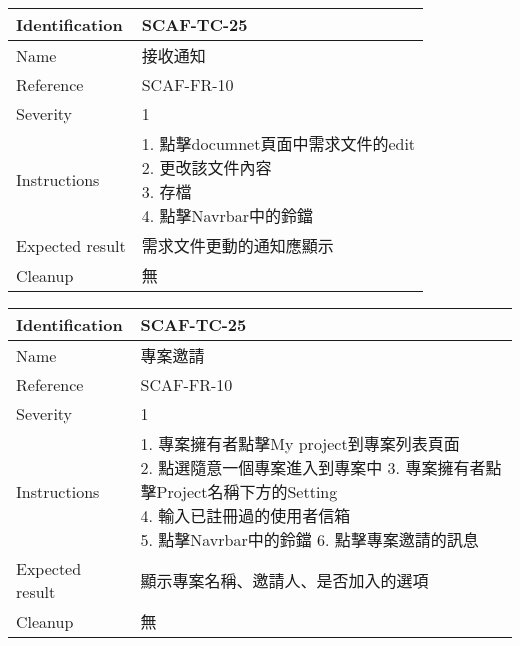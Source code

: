 \documentclass{report}
\begin{document}
\begin{tabularx}{0.9\textwidth}{
  |p{}%
  |p{}|%
  }
  \hline
  \centering Identification &  SCAF-TC-25 \\
  \hline
  \centering Name & 接收通知 \\
  \hline
  \centering Reference & SCAF-FR-10 \\
  \hline
  \centering Severity & 1 \\
  \hline
  \centering Instructions & 
  \makecell{
    1. 點擊documnet頁面中需求文件的edit \\
    2. 更改該文件內容  \\
    3. 存檔  \\
    4. 點擊Navrbar中的鈴鐺
  }\\
  \hline
  \centering Expected result & 需求文件更動的通知應顯示 \\
  \hline
  \centering Cleanup & 無 \\
  \hline
\end{tabularx}
\newline\newline

\begin{tabularx}{0.9\textwidth}{
  |p{}%
  |p{}|%
  }
  \hline
  \centering Identification &  SCAF-TC-25 \\
  \hline
  \centering Name & 專案邀請 \\
  \hline
  \centering Reference & SCAF-FR-10 \\
  \hline
  \centering Severity & 1 \\
  \hline
  \centering Instructions & 
  \makecell{
    1. 專案擁有者點擊My project到專案列表頁面 \\
    2. 點選隨意一個專案進入到專案中
    3. 專案擁有者點擊Project名稱下方的Setting \\
    4. 輸入已註冊過的使用者信箱 \\
    5. 點擊Navrbar中的鈴鐺
    6. 點擊專案邀請的訊息
  }\\
  \hline
  \centering Expected result & 顯示專案名稱、邀請人、是否加入的選項 \\
  \hline
  \centering Cleanup & 無 \\
  \hline
\end{tabularx}
\newline\newline
\end{document}
